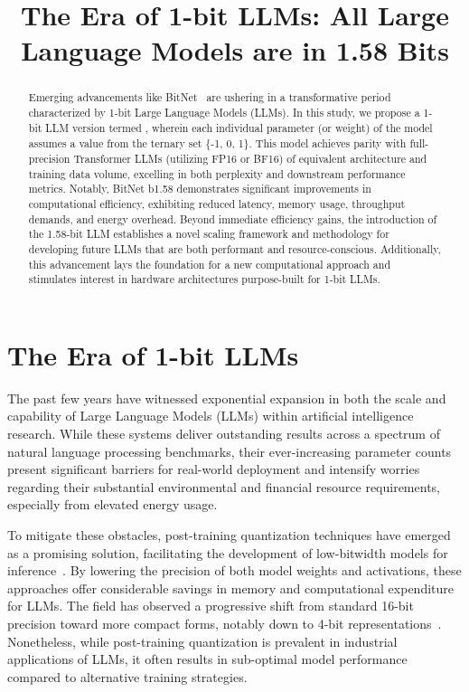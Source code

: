 \title{The Era of 1-bit LLMs: All Large Language Models are in 1.58 Bits}

\begin{abstract}
Emerging advancements like BitNet~\cite{bitnet} are ushering in a transformative period characterized by 1-bit Large Language Models (LLMs). In this study, we propose a 1-bit LLM version termed \textbf{}, wherein each individual parameter (or weight) of the model assumes a value from the ternary set \{-1, 0, 1\}. This model achieves parity with full-precision Transformer LLMs (utilizing FP16 or BF16) of equivalent architecture and training data volume, excelling in both perplexity and downstream performance metrics. Notably, BitNet b1.58 demonstrates significant improvements in computational efficiency, exhibiting reduced latency, memory usage, throughput demands, and energy overhead. Beyond immediate efficiency gains, the introduction of the 1.58-bit LLM establishes a novel scaling framework and methodology for developing future LLMs that are both performant and resource-conscious. Additionally, this advancement lays the foundation for a new computational approach and stimulates interest in hardware architectures purpose-built for 1-bit LLMs.
\end{abstract}

\section{The Era of 1-bit LLMs}

The past few years have witnessed exponential expansion in both the scale and capability of Large Language Models (LLMs) within artificial intelligence research. While these systems deliver outstanding results across a spectrum of natural language processing benchmarks, their ever-increasing parameter counts present significant barriers for real-world deployment and intensify worries regarding their substantial environmental and financial resource requirements, especially from elevated energy usage.

To mitigate these obstacles, post-training quantization techniques have emerged as a promising solution, facilitating the development of low-bitwidth models for inference~\cite{smoothquant, gptq, quip, quip_sharp}. By lowering the precision of both model weights and activations, these approaches offer considerable savings in memory and computational expenditure for LLMs. The field has observed a progressive shift from standard 16-bit precision toward more compact forms, notably down to 4-bit representations~\cite{gptq, awq}. Nonetheless, while post-training quantization is prevalent in industrial applications of LLMs, it often results in sub-optimal model performance compared to alternative training strategies.


